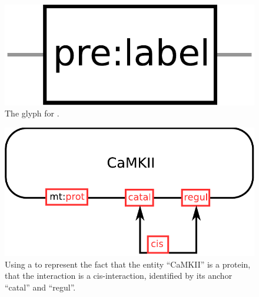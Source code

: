 \begin{figure}[H]
  \centering
  \includegraphics[scale = 0.3]{images/unitInformation}
  \caption{The \ER glyph for .}
  \label{fig:unitInformation}
\end{figure}

\begin{figure}[H]
  \centering
  \includegraphics[scale = 0.5]{examples/ex-unitInformation}
  \caption{Using a  to represent the fact that the entity ``CaMKII'' is a protein, that the interaction is a cis-interaction, identified by its anchor ``catal'' and ``regul''.}
  \label{fig:ex-unitInformation}
\end{figure}

\normalcolor
